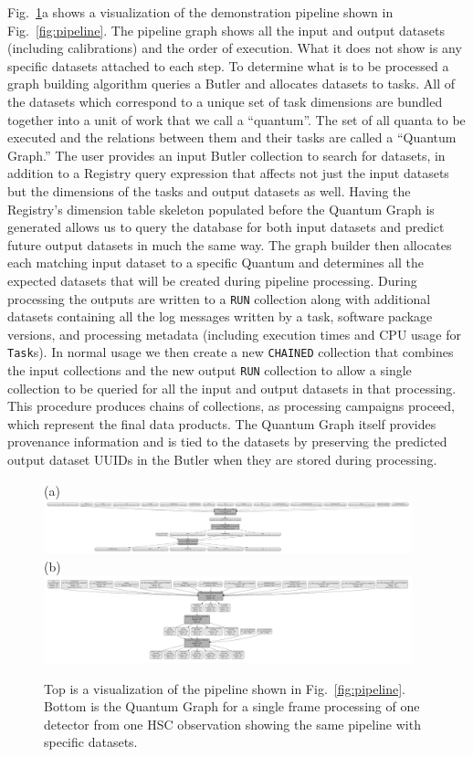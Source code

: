\documentclass[]{spie}
\begin{document}
Fig.~\ref{fig:graph}a shows a visualization of the demonstration pipeline shown in Fig.~\ref{fig:pipeline}.
The pipeline graph shows all the input and output datasets (including calibrations) and the order of execution.
What it does not show is any specific datasets attached to each step.
To determine what is to be processed a graph building algorithm queries a Butler and allocates datasets to tasks.
All of the datasets which correspond to a unique set of task dimensions are bundled together into a unit of work that we call a ``quantum''.
The set of all quanta to be executed and the relations between them and their tasks are called a ``Quantum Graph.''
The user provides an input Butler collection to search for datasets, in addition to a Registry query expression that affects not just the input datasets but the dimensions of the tasks and output datasets as well.
Having the Registry's dimension table skeleton populated before the Quantum Graph is generated allows us to query the database for both input datasets and predict future output datasets in much the same way.
The graph builder then allocates each matching input dataset to a specific Quantum and determines all the expected datasets that will be created during pipeline processing.
During processing the outputs are written to a \texttt{RUN} collection along with additional datasets containing all the log messages written by a task, software package versions, and processing metadata (including execution times and CPU usage for \texttt{Task}s).
In normal usage we then create a new \texttt{CHAINED} collection that combines the input collections and the new output \texttt{RUN} collection to allow a single collection to be queried for all the input and output datasets in that processing.
This procedure produces chains of collections, as processing campaigns proceed, which represent the final data products.
The Quantum Graph itself provides provenance information and is tied to the datasets by preserving the predicted output dataset UUIDs in the Butler when they are stored during processing.

\begin{figure}
  (a) \includegraphics[width=0.95\textwidth]{pipeline}
  (b) \includegraphics[width=0.95\textwidth]{quantum-graph}
  \caption{Top is a visualization of the pipeline shown in Fig.~\ref{fig:pipeline}. Bottom is the Quantum Graph for a single frame processing of one detector from one HSC observation showing the same pipeline with specific datasets.}
  \label{fig:graph}
  \end{figure}
\end{document}
